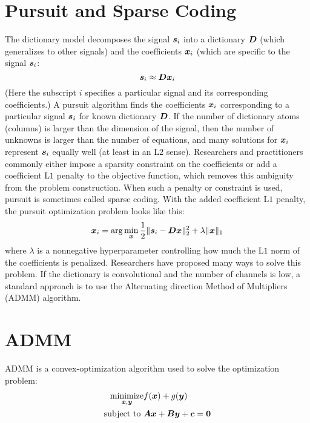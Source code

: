 \section{Pursuit and Sparse Coding}
\label{section:sparse coding}
The dictionary model decomposes the signal $\bm{s}_i$ into a dictionary $\bm{D}$ (which generalizes to other signals) and the coefficients $\bm{x}_i$ (which are specific to the signal $\bm{s}_i$:
%
\begin{equation}
\bm{s}_i \approx \bm{D}\bm{x}_i
\end{equation}
%
(Here the subscript $i$ specifies a particular signal and its corresponding coefficients.) A pursuit algorithm finds the coefficients $\bm{x}_i$ corresponding to a particular signal $\bm{s}_i$ for known dictionary $\bm{D}$. If the number of dictionary atoms (columns) is larger than the dimension of the signal, then the number of unknowns is larger than the number of equations, and many solutions for $\bm{x}_i$ represent $\bm{s}_i$ equally well (at least in an L$2$ sense). Researchers and practitioners commonly either impose a sparsity constraint on the coefficients or add a coefficient L$1$ penalty to the objective function, which removes this ambiguity from the problem construction. When such a penalty or constraint is used, pursuit is sometimes called sparse coding. With the added coefficient L$1$ penalty, the pursuit optimization problem looks like this:
%
\begin{equation}\label{equation:sparse coding}
\bm{x}_i = \arg\min_{\bm{x}} \frac{1}{2}\|\bm{s}_i - \bm{D}\bm{x}\|_2^2 + \lambda \|\bm{x}\|_1
\end{equation}
%
where $\lambda$ is a nonnegative hyperparameter controlling how much the L$1$ norm of the coefficients is penalized. Researchers have proposed many ways to solve this problem. If the dictionary is convolutional and the number of channels is low, a standard approach is to use the Alternating direction Method of Multipliers (ADMM) algorithm.

\section{ADMM}
\label{section:ADMM}
ADMM is a convex-optimization algorithm used to solve the optimization problem:
\begin{equation} \label{equation:ADMM}
\begin{aligned}
\operatorname*{\text{minimize}}_{\bm{x},\bm{y}} & f(\bm{x}) + g(\bm{y}) \\
\text{subject to } & \bm{A}\bm{x} + \bm{B}\bm{y} + \bm{c} = \bm{0} 
\end{aligned}
\end{equation}

